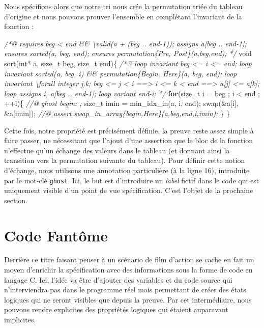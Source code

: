 \documentclass[12pt,francais,]{scrbook}
\newenvironment{Shaded}{}{}
\newcommand{\KeywordTok}[1]{\textcolor[rgb]{0.00,0.44,0.13}{\textbf{{#1}}}}
\newcommand{\DataTypeTok}[1]{\textcolor[rgb]{0.56,0.13,0.00}{{#1}}}
\newcommand{\CommentTok}[1]{\textcolor[rgb]{0.38,0.63,0.69}{\textit{{#1}}}}
\newcommand{\NormalTok}[1]{{#1}}
\begin{document}
Nous spécifions alors que notre tri nous crée la permutation triée du
tableau d'origine et nous pouvons prouver l'ensemble en complétant
l'invariant de la fonction :

\begin{footnotesize}\begin{Shaded}
\begin{Highlighting}[]
\CommentTok{/*@}
\CommentTok{  requires beg < end && \textbackslash{}valid(a + (beg .. end-1));}
\CommentTok{  assigns  a[beg .. end-1];  }
\CommentTok{  ensures sorted(a, beg, end);}
\CommentTok{  ensures permutation\{Pre, Post\}(a,beg,end);}
\CommentTok{*/}
\DataTypeTok{void} \NormalTok{sort(}\DataTypeTok{int}\NormalTok{* a, size_t beg, size_t end)\{}
  \CommentTok{/*@}
\CommentTok{    loop invariant beg <= i <= end;}
\CommentTok{    loop invariant sorted(a, beg, i) && permutation\{Begin, Here\}(a, beg, end);}
\CommentTok{    loop invariant \textbackslash{}forall integer j,k; beg <= j < i ==> i <= k < end ==> a[j] <= a[k];}
\CommentTok{    loop assigns i, a[beg .. end-1];}
\CommentTok{    loop variant end-i;}
\CommentTok{  */}
  \KeywordTok{for}\NormalTok{(size_t i = beg ; i < end ; ++i)\{}
    \CommentTok{//@ ghost begin: ;}
    \NormalTok{size_t imin = min_idx_in(a, i, end);}
    \NormalTok{swap(&a[i], &a[imin]);}
    \CommentTok{//@ assert swap_in_array\{begin,Here\}(a,beg,end,i,imin);}
  \NormalTok{\}}
\NormalTok{\}}
\end{Highlighting}
\end{Shaded}\end{footnotesize}

Cette fois, notre propriété est précisément définie, la preuve reste
assez simple à faire passer, ne nécessitant que l'ajout d'une assertion
que le bloc de la fonction n'effectue qu'un échange des valeurs dans le
tableau (et donnant ainsi la transition vers la permutation suivante du
tableau). Pour définir cette notion d'échange, nous utilisons une
annotation particulière (à la ligne 16), introduite par le mot-clé
\texttt{ghost}. Ici, le but est d'introduire un \emph{label} fictif dans
le code qui est uniquement visible d'un point de vue spécification.
C'est l'objet de la prochaine section.

\section{Code Fantôme}\label{code-fantuxf4me}

Derrière ce titre faisant penser à un scénario de film d'action se cache
en fait un moyen d'enrichir la spécification avec des informations sous
la forme de code en langage C. Ici, l'idée va être d'ajouter des
variables et du code source qui n'interviendra pas dans le programme
réel mais permettant de créer des états logiques qui ne seront visibles
que depuis la preuve. Par cet intermédiaire, nous pouvons rendre
explicites des propriétés logiques qui étaient auparavant implicites.
\end{document}
